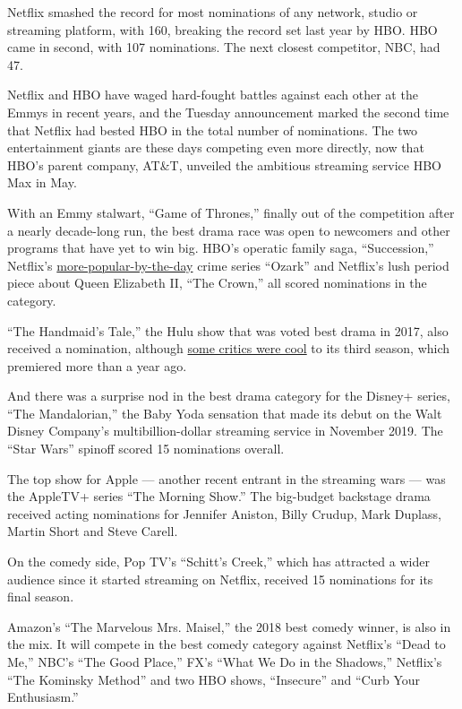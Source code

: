 Netflix smashed the record for most nominations of any network, studio
or streaming platform, with 160, breaking the record set last year by
HBO. HBO came in second, with 107 nominations. The next closest
competitor, NBC, had 47.

Netflix and HBO have waged hard-fought battles against each other at the
Emmys in recent years, and the Tuesday announcement marked the second
time that Netflix had bested HBO in the total number of nominations. The
two entertainment giants are these days competing even more directly,
now that HBO's parent company, AT\&T, unveiled the ambitious streaming
service HBO Max in May.

With an Emmy stalwart, ``Game of Thrones,'' finally out of the
competition after a nearly decade-long run, the best drama race was open
to newcomers and other programs that have yet to win big. HBO's operatic
family saga, ``Succession,'' Netflix's
\href{https://deadline.com/2020/04/ozark-season-3-ratings-netflix-1202915140/}{more-popular-by-the-day}
crime series ``Ozark'' and Netflix's lush period piece about Queen
Elizabeth II, ``The Crown,'' all scored nominations in the category.

``The Handmaid's Tale,'' the Hulu show that was voted best drama in
2017, also received a nomination, although
\href{https://www.metacritic.com/tv/the-handmaids-tale/critic-reviews?sort-by=date\&num_items=100}{some
critics were cool} to its third season, which premiered more than a year
ago.

And there was a surprise nod in the best drama category for the Disney+
series, ``The Mandalorian,'' the Baby Yoda sensation that made its debut
on the Walt Disney Company's multibillion-dollar streaming service in
November 2019. The ``Star Wars'' spinoff scored 15 nominations overall.

The top show for Apple --- another recent entrant in the streaming wars
--- was the AppleTV+ series ``The Morning Show.'' The big-budget
backstage drama received acting nominations for Jennifer Aniston, Billy
Crudup, Mark Duplass, Martin Short and Steve Carell.

On the comedy side, Pop TV's ``Schitt's Creek,'' which has attracted a
wider audience since it started streaming on Netflix, received 15
nominations for its final season.

Amazon's ``The Marvelous Mrs. Maisel,'' the 2018 best comedy winner, is
also in the mix. It will compete in the best comedy category against
Netflix's ``Dead to Me,'' NBC's ``The Good Place,'' FX's ``What We Do in
the Shadows,'' Netflix's ``The Kominsky Method'' and two HBO shows,
``Insecure'' and ``Curb Your Enthusiasm.''

